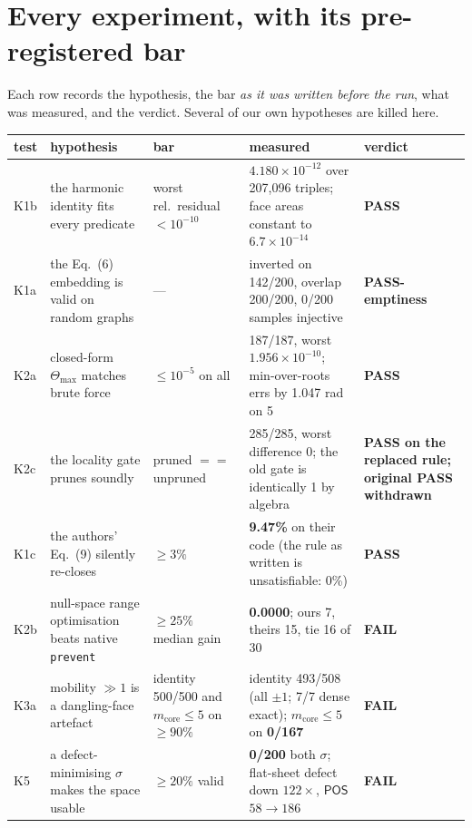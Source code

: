\documentclass[11pt,a4paper]{article}
\theoremstyle{definition}
\newcommand{\Tmax}{\Theta_{\max}}
\newcommand{\file}[1]{\texttt{\small #1}}
\newcommand{\POS}{\textsf{POS}}
\begin{document}
\section{Every experiment, with its pre-registered bar}

Each row records the hypothesis, the bar \emph{as it was written before the run}, what was
measured, and the verdict. Several of our own hypotheses are killed here.

\begin{center}
\scriptsize
\begin{longtable}{@{}p{}p{}p{}p{}p{}@{}}
\toprule
test & hypothesis & bar & measured & verdict \\
\midrule
\endhead
K1b & the harmonic identity fits every predicate & worst rel.\ residual $<10^{-10}$ & $4.180\times10^{-12}$ over 207{,}096 triples; face areas constant to $6.7\times10^{-14}$ & \textbf{PASS} \\
K1a & the Eq.~(6) embedding is valid on random graphs & --- & inverted on 142/200, overlap 200/200, 0/200 samples injective & \textbf{PASS-emptiness} \\
K2a & closed-form $\Tmax$ matches brute force & $\le10^{-5}$ on all & 187/187, worst $1.956\times10^{-10}$; min-over-roots errs by 1.047 rad on 5 & \textbf{PASS} \\
K2c & the locality gate prunes soundly & pruned $==$ unpruned & 285/285, worst difference 0; the old gate is identically 1 by algebra & \textbf{PASS on the replaced rule; original PASS withdrawn} \\
K1c & the authors' Eq.~(9) silently re-closes & $\ge3\%$ & \textbf{9.47\%} on their code (the rule as written is unsatisfiable: 0\%) & \textbf{PASS} \\
K2b & null-space range optimisation beats native \file{prevent} & $\ge25\%$ median gain & \textbf{0.0000}; ours 7, theirs 15, tie 16 of 30 & \textbf{FAIL} \\
K3a & mobility $\gg1$ is a dangling-face artefact & identity 500/500 and $m_{\mathrm{core}}\le5$ on $\ge90\%$ & identity 493/508 (all $\pm1$; 7/7 dense exact); $m_{\mathrm{core}}\le5$ on \textbf{0/167} & \textbf{FAIL} \\
K5 & a defect-minimising $\sigma$ makes the space usable & $\ge20\%$ valid & \textbf{0/200} both $\sigma$; flat-sheet defect down $122\times$, $\POS$ $58\to186$ & \textbf{FAIL} \\

\end{longtable}
\end{center}
\end{document}
